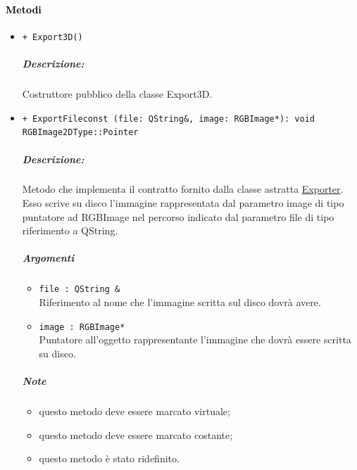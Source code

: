 \paragraph{\textcolor{black}{Metodi}}
	\begin{itemize}
		\item \color{blue}\verb!+ Export3D()!
		\color{black}
		\subparagraph{Descrizione:} Costruttore pubblico della classe Export3D.


		\item\color{blue}\verb!+ ExportFileconst (file: QString&, image: RGBImage*): void RGBImage2DType::Pointer!
		\color{black}
		\subparagraph{Descrizione:} Metodo che implementa il contratto fornito dalla classe astratta \hyperref[spexporter]{Exporter}. Esso scrive su disco l'immagine rappresentata dal parametro image di tipo puntatore ad RGBImage nel percorso indicato dal parametro file di tipo riferimento a QString.

		\subparagraph{Argomenti}
			\begin{itemize}
				\item \color{RoyalPurple}\verb!file : QString &! \\ 
				\color{black}Riferimento al nome che l'immagine scritta sul disco dovrà avere.
				\item \color{RoyalPurple}\verb!image : RGBImage*! \\ 
				\color{black}Puntatore all'oggetto rappresentante l'immagine che dovrà essere scritta su disco.
			\end{itemize}
\color{black}
		\subparagraph{Note}
			\begin{itemize}
				\item questo metodo deve essere marcato virtuale;
				\item questo metodo deve essere marcato costante;
				\item questo metodo è stato ridefinito.
			\end{itemize} 
	\end{itemize}
\color{black}

\pagebreak
